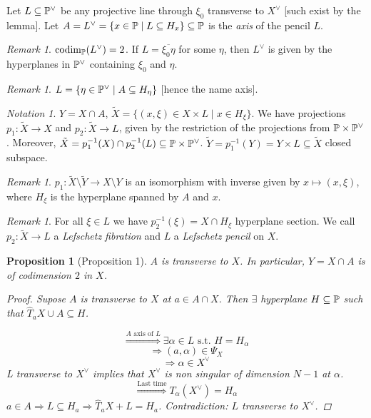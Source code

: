 \documentclass[A4paper, british, reqno]{amsart}
\theoremstyle{darkgreentheorem}
\newtheorem{prop}[thm]{Proposition}
\theoremstyle{darkbluedefinition}
\theoremstyle{darkredexample}
\theoremstyle{remark}
\newtheorem{rem}[thm]{Remark}
\newtheorem{nota}[thm]{Notation}
\DeclareMathOperator{\codim}{codim}
\newcommand{\1}{\mathbbm{1}}
\newcommand{\dual}{^{\vee}}
\newcommand{\sub}{\subseteq}
\begin{document}
Let $L\sub \P\dual$ be any projective line through $\xi_{0}$ transverse to $X\dual$ [such exist by the lemma].
Let $A=L\dual=\{x\in \P\mid L\sub H_{x}\}\sub \P$ is the \textit{axis} of the pencil $L$.

\begin{rem}
    $\codim_{\P}(L\dual)=2$.
    If $L=\overline{\xi_{0}\eta}$ for some $\eta$, then $L\dual$ is given by the hyperplanes in $\P\dual$ containing $\xi_{0}$ and $\eta$.
\end{rem}

\begin{rem}
    $L=\{\eta\in \P\dual \mid A\sub H_{\eta}\}$ [hence the name axis].
\end{rem}

\begin{nota}
    $Y=X\cap A$, $\tilde{X}=\{(x,\xi)\in X\times L\mid x\in H_{\xi}\}$.
    We have projections $p_{1}\colon \tilde{X}\to X$ and $p_{2}\colon \tilde{X}\to L$, given by the restriction of the projections from $\P\times \P\dual$.
    Moreover, $\tilde{X}=p_{1}^{-1}(X)\cap p_{2}^{-1}(L)\sub \P\times \P\dual$.
    $\tilde{Y}=p_{1}^{-1}(Y)=Y\times L\sub \tilde{X}$ closed subspace.
\end{nota}

\begin{rem}
    $p_{1}\colon \tilde{X}\setminus \tilde{Y}\to X\setminus Y$ is an isomorphism with inverse given by $x\mapsto (x,\xi)$, where $H_{\xi}$ is the hyperplane spanned by $A$ and $x$.
\end{rem}

\begin{rem}
    For all $\xi\in L$ we have $p_{2}^{-1}(\xi)=X\cap H_{\xi}$ hyperplane section.
    We call $p_{2}\colon \tilde{X}\to L$ a \textit{Lefschetz fibration} and $L$ a \textit{Lefschetz pencil} on $X$.
\end{rem}

\begin{prop}[Proposition 1]
    $A$ is transverse to $X$.
    In particular, $Y=X\cap A$ is of codimension $2$ in $X$.
    \begin{proof}
	Supose $A$ is transverse to $X$ at $a\in A\cap X$.
	Then $\exists$ hyperplane $H\sub \P$ such that $\hat{T}_{a}X\cup A\sub H$.

	\[ \overset{A \text{ axis of }L }{\Rightarrow} \exists \alpha \in L \text{ s.t. }H=H_{\alpha}\]
	\[ \Rightarrow (a,\alpha)\in \Psi_{X} \]
	\[ \Rightarrow \alpha \in X\dual \]
	L transverse to $X\dual$ implies that $X\dual$ is non singular of dimension $N-1$ at $\alpha$.
	\[ \overset{\text{Last time}}{\Rightarrow} T_{\alpha}(X\dual)=H_{\alpha} \]
	$a\in A\Rightarrow L\sub H_{a}\Rightarrow \hat{T}_{a}X+L= H_{a}$.
	Contradiction: $L$ transverse to $X\dual$.
    \end{proof}
\end{prop}
\end{document}
